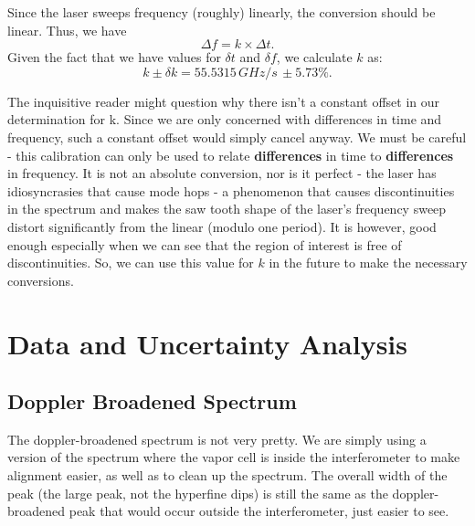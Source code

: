 \documentclass{article}
\begin{document}
  \hspace{.25cm}

  Since the laser sweeps frequency (roughly) linearly, the conversion should be linear.  Thus, we have
  \begin{equation*}
    \Delta f = k \times \Delta t.
  \end{equation*}
  Given the fact that we have values for $\delta t$ and $\delta f$, we calculate $k$ as:
  \begin{equation}
    k \pm \delta k = 55.5315 \, G\!H\!z/s \, \pm 5.73\%.
    \label{k}
  \end{equation}

  The inquisitive reader might question why there isn't a constant offset in our determination for k.  Since we are only concerned with differences in time and frequency, such a constant offset would simply cancel anyway.  We must be careful - this calibration can only be used to relate \textbf{differences} in time to \textbf{differences} in frequency.  It is not an absolute conversion, nor is it perfect - the laser has idiosyncrasies that cause mode hops - a phenomenon that causes discontinuities in the spectrum and makes the saw tooth shape of the laser's frequency sweep distort significantly from the linear (modulo one period).  It is however, good enough especially when we can see that the region of interest is free of discontinuities.  So, we can use this value for $k$ in the future to make the necessary conversions.

\section{Data and Uncertainty Analysis}
  \subsection{Doppler Broadened Spectrum}
  The doppler-broadened spectrum is not very pretty.  We are simply using a version of the spectrum where the vapor cell is inside the interferometer to make alignment easier, as well as to clean up the spectrum.  The overall width of the peak (the large peak, not the hyperfine dips) is still the same as the doppler-broadened peak that would occur outside the interferometer, just easier to see.
\end{document}
